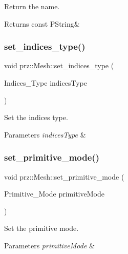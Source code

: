 Return the name. 

\begin{DoxyReturn}{Returns}
const P\+String\& 
\end{DoxyReturn}
\mbox{\label{classprz_1_1_mesh_aef8f3ed8273c53307cd7633564c15dd2}} 
\subsubsection{\texorpdfstring{set\_indices\_type()}{set\_indices\_type()}}
{\footnotesize\ttfamily void prz\+::\+Mesh\+::set\+\_\+indices\+\_\+type (\begin{DoxyParamCaption}\item[{Indices\+\_\+\+Type}]{indices\+Type }\end{DoxyParamCaption})\hspace{0.3cm}{\ttfamily [inline]}}



Set the indices type. 


\begin{DoxyParams}{Parameters}
{\em indices\+Type} & \\
\hline
\end{DoxyParams}
\mbox{\label{classprz_1_1_mesh_a909e0d3a9a3670425b6215546b572b1c}} 
\subsubsection{\texorpdfstring{set\_primitive\_mode()}{set\_primitive\_mode()}}
{\footnotesize\ttfamily void prz\+::\+Mesh\+::set\+\_\+primitive\+\_\+mode (\begin{DoxyParamCaption}\item[{Primitive\+\_\+\+Mode}]{primitive\+Mode }\end{DoxyParamCaption})\hspace{0.3cm}{\ttfamily [inline]}}



Set the primitive mode. 


\begin{DoxyParams}{Parameters}
{\em primitive\+Mode} & \\
\hline
\end{DoxyParams}
\mbox{\label{classprz_1_1_mesh_a8d66563903c78c841d6019da34ef368b}} 
